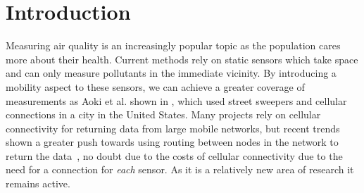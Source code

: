 \chapter{Introduction}\label{introduction}



    Measuring air quality is an increasingly popular topic as the population cares more about their health. Current methods rely on static sensors which take space and can only measure pollutants in the immediate vicinity. By introducing a mobility aspect to these sensors, we can achieve a greater coverage of measurements as Aoki et al. shown in \cite{vehicleforresearch}, which used street sweepers and cellular connections in a city in the United States. Many projects rely on cellular connectivity for returning data from large mobile networks, but recent trends shown a greater push towards using routing between nodes in the network to return the data~\cite{manetmessaging,cafnet,cartel,commonsense}, no doubt due to the costs of cellular connectivity due to the need for a connection for \emph{each} sensor. As it is a relatively new area of research it remains active. 

